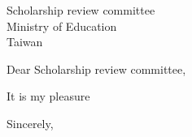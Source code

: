 \documentclass[12pt, a4paper]{simref} %
\begin{document}

\begin{letter}{
	Scholarship review committee\\
	Ministry of Education\\
	Taiwan\\
}


\opening{Dear Scholarship review committee,}

It is my pleasure


\closing{Sincerely,}




\end{letter}
\end{document}

